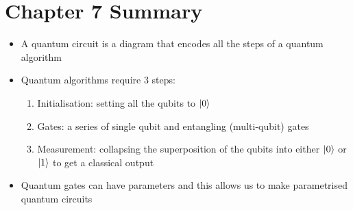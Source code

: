 
\section{Chapter 7 Summary}

\begin{itemize}
\item A quantum circuit is a diagram that encodes all the steps of a quantum algorithm
\item Quantum algorithms require 3 steps:
\begin{enumerate}
    \item Initialisation: setting all the qubits to $\ket{0}$
    \item Gates: a series of single qubit and entangling (multi-qubit) gates
    \item Measurement: collapsing the superposition of the qubits into either $\ket{0}$ or $\ket{1}$ to get a classical output 
\end{enumerate}

\item Quantum gates can have parameters and this allows us to make parametrised quantum circuits 

\end{itemize}
